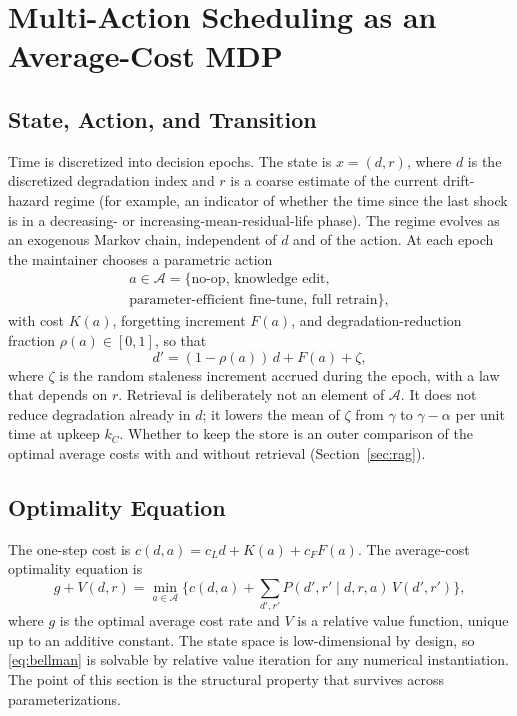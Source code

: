 \documentclass[journal]{IEEEtran}
\begin{document}
\section{Multi-Action Scheduling as an Average-Cost MDP}\label{sec:mdp}
\subsection{State, Action, and Transition}
Time is discretized into decision epochs. The state is $x=(d,r)$, where $d$ is the discretized degradation index and $r$ is a coarse estimate of the current drift-hazard regime (for example, an indicator of whether the time since the last shock is in a decreasing- or increasing-mean-residual-life phase). The regime evolves as an exogenous Markov chain, independent of $d$ and of the action. At each epoch the maintainer chooses a parametric action
\begin{equation}
\begin{gathered}a\in\mathcal A=\{\text{no-op, knowledge edit,}\\ \text{parameter-efficient fine-tune, full retrain}\},\end{gathered}
\end{equation}
with cost $K(a)$, forgetting increment $F(a)$, and degradation-reduction fraction $\rho(a)\in[0,1]$, so that
\begin{equation}
d'=(1-\rho(a))\,d+F(a)+\zeta,
\label{eq:trans}
\end{equation}
where $\zeta$ is the random staleness increment accrued during the epoch, with a law that depends on $r$. Retrieval is deliberately not an element of $\mathcal A$. It does not reduce degradation already in $d$; it lowers the mean of $\zeta$ from $\gamma$ to $\gamma-\alpha$ per unit time at upkeep $k_C$. Whether to keep the store is an outer comparison of the optimal average costs with and without retrieval (Section~\ref{sec:rag}).

\subsection{Optimality Equation}
The one-step cost is $c(d,a)=c_L d+K(a)+c_F F(a)$. The average-cost optimality equation \cite{puterman1994,bertsekas2017} is
\begin{equation}
g+V(d,r)=\min_{a\in\mathcal A}\Big\{c(d,a)+\sum_{d',r'}P(d',r'\mid d,r,a)\,V(d',r')\Big\},
\label{eq:bellman}
\end{equation}
where $g$ is the optimal average cost rate and $V$ is a relative value function, unique up to an additive constant. The state space is low-dimensional by design, so \eqref{eq:bellman} is solvable by relative value iteration for any numerical instantiation. The point of this section is the structural property that survives across parameterizations.
\end{document}
